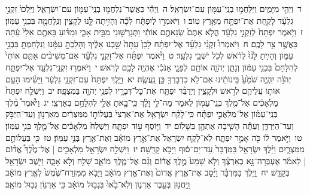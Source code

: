 \documentclass[18pt]{article}
\begin{document}
 {\loc ד~}וַיְהִ֖י מִיָּמִ֑ים וַיִּלָּחֲמ֥וּ בְנֵֽי־עַמּ֖וֹן עִם־יִשְׂרָאֵֽל׃ \startlock
 {\loc ה~}וַיְהִ֕י כַּאֲשֶׁר־נִלְחֲמ֥וּ בְנֵֽי־עַמּ֖וֹן עִם־יִשְׂרָאֵ֑ל וַיֵּֽלְכוּ֙ זִקְנֵ֣י גִלְעָ֔ד לָקַ֥חַת אֶת־יִפְתָּ֖ח מֵאֶ֥רֶץ טֽוֹב׃ \startlock
 {\loc ו~}וַיֹּאמְר֣וּ לְיִפְתָּ֔ח לְכָ֕ה וְהָיִ֥יתָה לָּ֖נוּ לְקָצִ֑ין וְנִֽלָּחֲמָ֖ה בִּבְנֵ֥י עַמּֽוֹן׃ \startlock
 {\loc ז~}וַיֹּ֤אמֶר יִפְתָּח֙ לְזִקְנֵ֣י גִלְעָ֔ד הֲלֹ֤א אַתֶּם֙ שְׂנֵאתֶ֣ם אוֹתִ֔י וַתְּגָרְשׁ֖וּנִי מִבֵּ֣ית אָבִ֑י וּמַדּ֜וּעַ בָּאתֶ֤ם אֵלַי֙ עַ֔תָּה כַּאֲשֶׁ֖ר צַ֥ר לָכֶֽם׃ \startlock
 {\loc ח~}וַיֹּאמְרוּ֩ זִקְנֵ֨י גִלְעָ֜ד אֶל־יִפְתָּ֗ח לָכֵן֙ עַתָּה֙ שַׁ֣בְנוּ אֵלֶ֔יךָ וְהָלַכְתָּ֣ עִמָּ֔נוּ וְנִלְחַמְתָּ֖ בִּבְנֵ֣י עַמּ֑וֹן וְהָיִ֤יתָ לָּ֙נוּ֙ לְרֹ֔אשׁ לְכֹ֖ל יֹשְׁבֵ֥י גִלְעָֽד׃ \startlock
 {\loc ט~}וַיֹּ֨אמֶר יִפְתָּ֜ח אֶל־זִקְנֵ֣י גִלְעָ֗ד אִם־מְשִׁיבִ֨ים אַתֶּ֤ם אוֹתִי֙ לְהִלָּחֵם֙ בִּבְנֵ֣י עַמּ֔וֹן וְנָתַ֧ן יְהֹוָ֛ה אוֹתָ֖ם לְפָנָ֑י אָנֹכִ֕י אֶהְיֶ֥ה לָכֶ֖ם לְרֹֽאשׁ׃ \startlock
 {\loc י~}וַיֹּאמְר֥וּ זִקְנֵֽי־גִלְעָ֖ד אֶל־יִפְתָּ֑ח יְהֹוָ֗ה יִֽהְיֶ֤ה שֹׁמֵ֙עַ֙ בֵּינוֹתֵ֔ינוּ אִם־לֹ֥א כִדְבָרְךָ֖ כֵּ֥ן נַֽעֲשֶֽׂה׃ \startlock
 {\loc יא~}וַיֵּ֤לֶךְ יִפְתָּח֙ עִם־זִקְנֵ֣י גִלְעָ֔ד וַיָּשִׂ֨ימוּ הָעָ֥ם אוֹת֛וֹ עֲלֵיהֶ֖ם לְרֹ֣אשׁ וּלְקָצִ֑ין וַיְדַבֵּ֨ר יִפְתָּ֧ח אֶת־כׇּל־דְּבָרָ֛יו לִפְנֵ֥י יְהֹוָ֖ה בַּמִּצְפָּֽה׃ \startlock
 {\loc יב~}וַיִּשְׁלַ֤ח יִפְתָּח֙ מַלְאָכִ֔ים אֶל־מֶ֥לֶךְ בְּנֵֽי־עַמּ֖וֹן לֵאמֹ֑ר מַה־לִּ֣י וָלָ֔ךְ כִּֽי־בָ֥אתָ אֵלַ֖י לְהִלָּחֵ֥ם בְּאַרְצִֽי׃ \startlock
 {\loc יג~}וַיֹּ֩אמֶר֩ מֶ֨לֶךְ בְּנֵֽי־עַמּ֜וֹן אֶל־מַלְאֲכֵ֣י יִפְתָּ֗ח כִּֽי־לָקַ֨ח יִשְׂרָאֵ֤ל אֶת־אַרְצִי֙ בַּעֲלוֹת֣וֹ מִמִּצְרַ֔יִם מֵאַרְנ֥וֹן וְעַד־הַיַּבֹּ֖ק וְעַד־הַיַּרְדֵּ֑ן וְעַתָּ֕ה הָשִׁ֥יבָה אֶתְהֶ֖ן בְּשָׁלֽוֹם׃ \startlock
 {\loc יד~}וַיּ֥וֹסֶף ע֖וֹד יִפְתָּ֑ח וַיִּשְׁלַח֙ מַלְאָכִ֔ים אֶל־מֶ֖לֶךְ בְּנֵ֥י עַמּֽוֹן׃ \startlock
 {\loc טו~}וַיֹּ֣אמֶר ל֔וֹ כֹּ֖ה אָמַ֣ר יִפְתָּ֑ח לֹֽא־לָקַ֤ח יִשְׂרָאֵל֙ אֶת־אֶ֣רֶץ מוֹאָ֔ב וְאֶת־אֶ֖רֶץ בְּנֵ֥י עַמּֽוֹן׃ \startlock
 {\loc טז~}כִּ֖י בַּעֲלוֹתָ֣ם מִמִּצְרָ֑יִם וַיֵּ֨לֶךְ יִשְׂרָאֵ֤ל בַּמִּדְבָּר֙ עַד־יַם־ס֔וּף וַיָּבֹ֖א קָדֵֽשָׁה׃ \startlock
 {\loc יז~}וַיִּשְׁלַ֣ח יִשְׂרָאֵ֣ל מַלְאָכִ֣ים  |  אֶל־מֶ֩לֶךְ֩ אֱד֨וֹם  |  לֵאמֹ֜ר אֶעְבְּרָה־נָּ֣א בְאַרְצֶ֗ךָ וְלֹ֤א שָׁמַע֙ מֶ֣לֶךְ אֱד֔וֹם וְגַ֨ם אֶל־מֶ֧לֶךְ מוֹאָ֛ב שָׁלַ֖ח וְלֹ֣א אָבָ֑ה וַיֵּ֥שֶׁב יִשְׂרָאֵ֖ל בְּקָדֵֽשׁ׃ \startlock
 {\loc יח~}וַיֵּ֣לֶךְ בַּמִּדְבָּ֗ר וַיָּ֜סׇב אֶת־אֶ֤רֶץ אֱדוֹם֙ וְאֶת־אֶ֣רֶץ מוֹאָ֔ב וַיָּבֹ֤א מִמִּזְרַח־שֶׁ֙מֶשׁ֙ לְאֶ֣רֶץ מוֹאָ֔ב וַֽיַּחֲנ֖וּן בְּעֵ֣בֶר אַרְנ֑וֹן וְלֹֽא־בָ֙אוּ֙ בִּגְב֣וּל מוֹאָ֔ב כִּ֥י אַרְנ֖וֹן גְּב֥וּל מוֹאָֽב׃ \startlock
\end{document}
